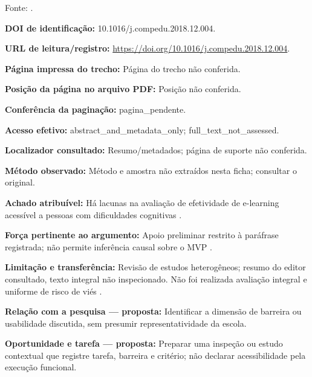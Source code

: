 Fonte: \citet{cinquin2019}.

\noindent\textbf{DOI de identificação:} 10.1016/j.compedu.2018.12.004.\par\medskip

\noindent\textbf{URL de leitura/registro:} \url{https://doi.org/10.1016/j.compedu.2018.12.004}.\par\medskip

\noindent\textbf{Página impressa do trecho:} Página do trecho não conferida.\par\medskip

\noindent\textbf{Posição da página no arquivo PDF:} Posição não conferida.\par\medskip

\noindent\textbf{Conferência da paginação:} pagina\_pendente.\par\medskip

\noindent\textbf{Acesso efetivo:} abstract\_and\_metadata\_only; full\_text\_not\_assessed.\par\medskip

\noindent\textbf{Localizador consultado:} Resumo/metadados; página de suporte não conferida.\par\medskip

\noindent\textbf{Método observado:} Método e amostra não extraídos nesta ficha; consultar o original.\par\medskip

\noindent\textbf{Achado atribuível:} Há lacunas na avaliação de efetividade de e-learning acessível a pessoas com dificuldades cognitivas \citep{cinquin2019}.\par\medskip

\noindent\textbf{Força pertinente ao argumento:} Apoio preliminar restrito à paráfrase registrada; não permite inferência causal sobre o MVP \citep{cinquin2019}.\par\medskip

\noindent\textbf{Limitação e transferência:} Revisão de estudos heterogêneos; resumo do editor consultado, texto integral não inspecionado. Não foi realizada avaliação integral e uniforme de risco de viés \citep{cinquin2019}.\par\medskip

\noindent\textbf{Relação com a pesquisa — proposta:} Identificar a dimensão de barreira ou usabilidade discutida, sem presumir representatividade da escola.\par\medskip

\noindent\textbf{Oportunidade e tarefa — proposta:} Preparar uma inspeção ou estudo contextual que registre tarefa, barreira e critério; não declarar acessibilidade pela execução funcional.\par\medskip

